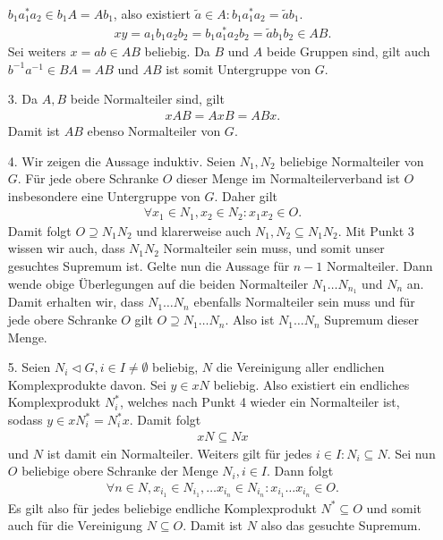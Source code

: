 \begin{solution}
\begin{itemize}
  $b_1a_1^*a_2 \in b_1A = Ab_1$, also existiert $\widetilde{a} \in A: b_1a_1^*a_2 = \widetilde{a}b_1$.
  \begin{align*}
    xy = a_1b_1a_2b_2 = b_1a_1^*a_2b_2 = \widetilde{a}b_1b_2 \in AB.
  \end{align*}
  Sei weiters $x = ab \in AB$ beliebig. Da $B$ und $A$ beide Gruppen sind, gilt
  auch $b^{-1}a^{-1} \in BA = AB$ und $AB$ ist somit Untergruppe von $G$.
  \item [3.] Da $A,B$ beide Normalteiler sind, gilt
  \begin{align*}
    xAB = AxB = ABx.
  \end{align*}
  Damit ist $AB$ ebenso Normalteiler von $G$.
  \item [4.] Wir zeigen die Aussage induktiv.
  Seien $N_1,N_2$ beliebige Normalteiler von $G$. Für jede
  obere Schranke $O$ dieser Menge im Normalteilerverband ist $O$
  insbesondere eine Untergruppe von $G$. Daher gilt
  \begin{align*}
    \forall x_1 \in N_1, x_2 \in N_2: x_1x_2 \in O.
  \end{align*}
  Damit folgt $O \supseteq N_1N_2$ und klarerweise auch $N_1,N_2 \subseteq N_1N_2$.
  Mit Punkt 3 wissen wir auch, dass $N_1N_2$
  Normalteiler sein muss, und somit unser gesuchtes Supremum ist.
  Gelte nun die Aussage für $n - 1$ Normalteiler. Dann wende obige Überlegungen
  auf die beiden Normalteiler $N_1\dots N_{n_1}$ und $N_n$ an.
  Damit erhalten wir, dass $N_1\dots N_n$ ebenfalls Normalteiler sein muss
  und für jede obere Schranke $O$ gilt $O \supseteq N_1\dots N_n$.
  Also ist $N_1\dots N_n$ Supremum dieser Menge.
  \item [5.] Seien $N_i \vartriangleleft G, i \in I \neq \emptyset$ beliebig,
  $N$ die Vereinigung aller endlichen Komplexprodukte davon.
  Sei $y \in xN$ beliebig. Also existiert ein endliches Komplexprodukt $N_i^*$,
  welches nach Punkt 4 wieder ein Normalteiler ist, sodass $y \in xN_i^* = N_i^*x$.
  Damit folgt
  \begin{align*}
    xN \subseteq Nx
  \end{align*}
  und $N$ ist damit ein Normalteiler. Weiters gilt für jedes $i \in I: N_i \subseteq N$.
  Sei nun $O$ beliebige obere Schranke der Menge $N_i, i\in I$. Dann folgt
  \begin{align*}
    \forall n \in N, x_{i_1} \in N_{i_1},\dots x_{i_n} \in N_{i_n}: x_{i_1}\dots x_{i_n} \in O.
  \end{align*}
  Es gilt also für jedes beliebige endliche Komplexprodukt $N^* \subseteq O$
  und somit auch für die Vereinigung $N \subseteq O$.
  Damit ist $N$ also das gesuchte Supremum.
\end{itemize}
\end{solution}

